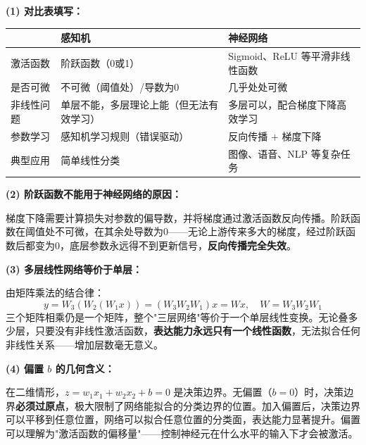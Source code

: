 \documentclass[a4paper,11pt]{ctexart}
\begin{document}
\begin{solutionbox}[参考答案与详细解析]
    \textbf{(1) 对比表填写：}

    \begin{center}
    \begin{tabular}{p{3.0cm} p{4.2cm} p{4.2cm}}
        \toprule
        & \textbf{感知机} & \textbf{神经网络} \\
        \midrule
        激活函数 & 阶跃函数（0或1） & Sigmoid、ReLU 等平滑非线性函数 \\[0.8em]
        是否可微 & 不可微（阈值处）/导数为0 & 几乎处处可微 \\[0.8em]
        非线性问题 & 单层不能，多层理论上能（但无法有效学习） & 多层可以，配合梯度下降高效学习 \\[0.8em]
        参数学习 & 感知机学习规则（错误驱动） & 反向传播 + 梯度下降 \\[0.8em]
        典型应用 & 简单线性分类 & 图像、语音、NLP 等复杂任务 \\
        \bottomrule
    \end{tabular}
    \end{center}

    \textbf{(2) 阶跃函数不能用于神经网络的原因：}

    梯度下降需要计算损失对参数的偏导数，并将梯度通过激活函数反向传播。阶跃函数在阈值处不可微，在其余处导数为0——无论上游传来多大的梯度，经过阶跃函数后都变为0，底层参数永远得不到更新信号，\textbf{反向传播完全失效}。

    \textbf{(3) 多层线性网络等价于单层：}

    由矩阵乘法的结合律：
    \[
    y = W_3(W_2(W_1 x)) = (W_3 W_2 W_1)x = Wx, \quad W = W_3 W_2 W_1
    \]
    三个矩阵相乘仍是一个矩阵，整个"三层网络"等价于一个单层线性变换。无论叠多少层，只要没有非线性激活函数，\textbf{表达能力永远只有一个线性函数}，无法拟合任何非线性关系——增加层数毫无意义。

    \textbf{(4) 偏置 $b$ 的几何含义：}

    在二维情形，$z = w_1x_1 + w_2x_2 + b = 0$ 是决策边界。无偏置（$b=0$）时，决策边界\textbf{必须过原点}，极大限制了网络能拟合的分类边界的位置。加入偏置后，决策边界可以平移到任意位置，网络可以拟合任意位置的分类面，表达能力显著提升。偏置可以理解为"激活函数的偏移量"——控制神经元在什么水平的输入下才会被激活。
\end{solutionbox}
\end{document}
